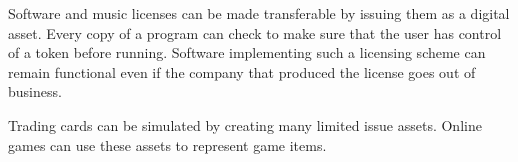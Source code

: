Software and music licenses can be made transferable by issuing them as a
digital asset. Every copy of a program can check to make sure that the user
has control of a token before running. Software implementing such a licensing
scheme can remain functional even if the company that produced the license goes
out of business.

Trading cards can be simulated by creating many limited issue assets. Online
games can use these assets to represent game items.
